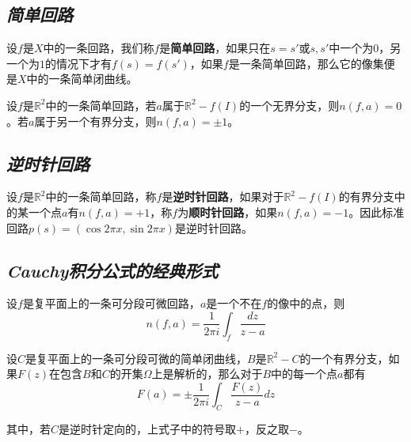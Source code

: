 \subsection*{\textsl{简单回路}}

\begin{define}
    设$f$是$X$中的一条回路，我们称$f$是\textbf{简单回路}，如果只在$s=s'$或$s,s'$中一个为$0$，另一个为$1$的情况下才有$f(s)=f(s')$，如果$f$是一条简单回路，那么它的像集便是$X$中的一条简单闭曲线。
\end{define}

\vspace*{1em}

\begin{mdframed}
    \begin{theorem}
        设$f$是$\mathbb{R}^2$中的一条简单回路，若$a$属于$\mathbb{R}^2-f(I)$的一个无界分支，则$n(f,a)=0$。若$a$属于另一个有界分支，则$n(f,a)=\pm 1$。
    \end{theorem}
\end{mdframed}

\subsection*{\textsl{逆时针回路}}

\begin{define}
    设$f$是$\mathbb{R}^2$中的一条简单回路，称$f$是\textbf{逆时针回路}，如果对于$\mathbb{R}^2-f(I)$的有界分支中的某一个点$a$有$n(f,a)=+ 1$，称$f$为\textbf{顺时针回路}，如果$n(f,a)=-1$。因此标准回路$p(s)=(\cos{2\pi x},\sin{2\pi x})$是逆时针回路。
\end{define}

\subsection*{\textsl{Cauchy积分公式的经典形式}}

\begin{mdframed}
    \begin{lemma}
        设$f$是复平面上的一条可分段可微回路，$a$是一个不在$f$的像中的点，则
        \begin{equation}
            n(f,a)=\frac{1}{2\pi i}\int_{f}\frac{dz}{z-a}
        \end{equation}
    \end{lemma}
\end{mdframed}

\begin{mdframed}
    \begin{theorem}
         设$C$是复平面上的一条可分段可微的简单闭曲线，$B$是$\mathbb{R}^2-C$的一个有界分支，如果$F(z)$在包含$B$和$C$的开集$\Omega$上是解析的，那么对于$B$中的每一个点$a$都有
        \begin{equation}
            F(a)=\pm \frac{1}{2\pi i}\int_{C} \frac{F(z)}{z-a}dz
        \end{equation}

        其中，若$C$是逆时针定向的，上式子中的符号取$+$，反之取$-$。
    \end{theorem}
\end{mdframed}

